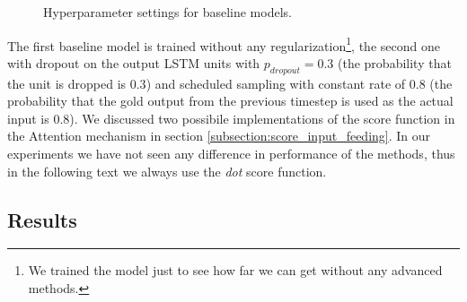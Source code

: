 \begin{figure}[h]
    \caption{Hyperparameter settings for baseline models.} \label{figure:hyperparameters_baseline}
\end{figure}

The first baseline model is trained without any regularization\footnote{We trained the model just to see how far we can get without any advanced methods.}, the second one with dropout on the output LSTM units with $p_{dropout} = 0.3$ (the probability that the unit is dropped is $0.3$) and scheduled sampling with constant rate of $0.8$ (the probability that the gold output from the previous timestep is used as the actual input is $0.8$). We discussed two possibile implementations of the score function in the Attention mechanism in section \ref{subsection:score_input_feeding}. In our experiments we have not seen any difference in performance of the methods, thus in the following text we always use the \emph{dot} score function.

\subsection{Results}

